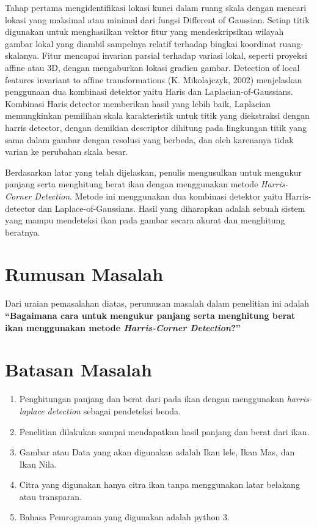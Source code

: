 Tahap pertama mengidentifikasi lokasi kunci dalam ruang skala dengan mencari lokasi yang maksimal atau minimal dari fungsi Different of Gaussian. 
Setiap titik digunakan untuk menghasilkan vektor fitur yang mendeskripsikan wilayah gambar lokal yang diambil sampelnya relatif terhadap bingkai koordinat ruang-skalanya. Fitur mencapai invarian parsial terhadap variasi lokal, 
seperti proyeksi affine atau 3D, dengan mengaburkan lokasi gradien gambar. Detection of local features invariant to affine transformations (K. Mikolajczyk, 2002) menjelaskan penggunaan dua kombinasi detektor yaitu Haris dan Laplacian-of-Gaussians. 
Kombinasi Haris  detector memberikan hasil yang lebih baik, Laplacian memungkinkan pemilihan skala karakteristik untuk titik yang diekstraksi dengan harris detector, dengan demikian descriptor dihitung pada lingkungan titik yang sama dalam gambar dengan resolusi yang berbeda, 
dan oleh karenanya tidak varian ke perubahan skala besar.
 
Berdasarkan latar yang telah dijelaskan, penulis mengusulkan untuk mengukur panjang serta menghitung berat ikan dengan menggunakan metode \emph{Harris-Corner Detection}. 
Metode ini menggunakan dua kombinasi detektor yaitu Harris-detector dan Laplace-of-Gaussians. Hasil yang diharapkan adalah sebuah sistem yang mampu mendeteksi ikan pada gambar secara akurat dan menghitung beratnya.


\section{Rumusan Masalah}
Dari uraian pemasalahan diatas, perumusan masalah dalam penelitian ini adalah \textbf{“Bagaimana cara untuk mengukur panjang serta menghitung berat ikan menggunakan metode \emph{Harris-Corner Detection}?”}

\section{Batasan Masalah}
\begin{enumerate}
	\item Penghitungan panjang dan berat dari pada ikan dengan menggunakan \emph{harris-laplace detection} sebagai pendeteksi benda. 
	\item Penelitian dilakukan sampai mendapatkan hasil panjang dan berat dari ikan. 
	\item Gambar atau Data yang akan digunakan adalah Ikan lele, Ikan Mas, dan Ikan Nila. 
	\item Citra yang digunakan hanya citra ikan tanpa menggunakan latar belakang atau transparan. 
	\item Bahasa Pemrograman yang digunakan adalah python 3. 
\end{enumerate}
	
